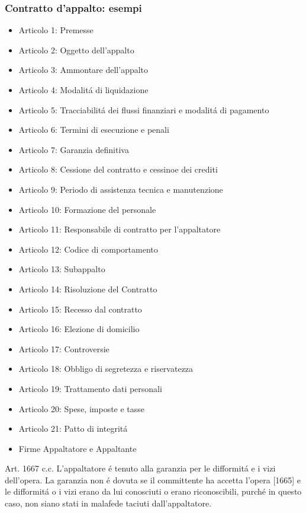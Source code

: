 \documentclass{article}
\begin{document}
\subsubsection{Contratto d'appalto: esempi}
\begin{itemize}
    \item Articolo 1: Premesse
    \item Articolo 2: Oggetto dell'appalto
    \item Articolo 3: Ammontare dell'appalto
    \item Articolo 4: Modalit\'a di liquidazione
    \item Articolo 5: Tracciabilit\'a dei flussi finanziari e modalit\'a di pagamento
    \item Articolo 6: Termini di esecuzione e penali
    \item Articolo 7: Garanzia definitiva
    \item Articolo 8: Cessione del contratto e cessinoe dei crediti
    \item Articolo 9: Periodo di assistenza tecnica e manutenzione
    \item Articolo 10: Formazione del personale
    \item Articolo 11: Responsabile di contratto per l'appaltatore
    \item Articolo 12: Codice di comportamento
    \item Articolo 13: Subappalto
    \item Articolo 14: Risoluzione del Contratto
    \item Articolo 15: Recesso dal contratto
    \item Articolo 16: Elezione di domicilio
    \item Articolo 17: Controversie
    \item Articolo 18: Obbligo di segretezza e riservatezza
    \item Articolo 19: Trattamento dati personali
    \item Articolo 20: Spese, imposte e tasse
    \item Articolo 21: Patto di integrit\'a
    \item Firme Appaltatore e Appaltante
\end{itemize}

Art. 1667 c.c. L'appaltatore \'e tenuto alla garanzia per le difformit\'a e i vizi dell'opera. La garanzia non \'e dovuta se il committente ha accetta l'opera [1665] e le difformit\'a o i vizi erano da lui conosciuti o erano riconoscibili, purch\'e in questo caso, non siano stati in malafede taciuti dall'appaltatore.
\end{document}
